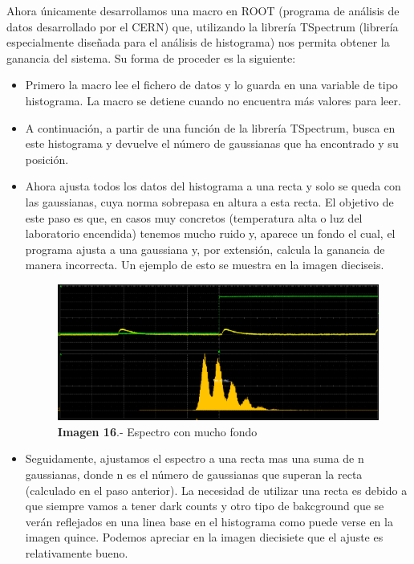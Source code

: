 Ahora únicamente desarrollamos una macro en ROOT (programa de análisis de datos desarrollado por el CERN) que, utilizando la librería TSpectrum (librería especialmente diseñada para el análisis de histograma) nos permita obtener la ganancia del sistema. Su forma de proceder es la siguiente:
\begin{itemize}
\item {} Primero la macro lee el fichero de datos y lo guarda en una variable de tipo histograma. La macro se detiene cuando no encuentra más valores para leer.

\item {} A continuación, a partir de una función de la librería TSpectrum, busca en este histograma y devuelve el número de gaussianas que ha encontrado y su posición.

\item {} Ahora ajusta todos los datos del histograma a una recta y solo se queda con las gaussianas, cuya norma sobrepasa en altura a esta recta. El objetivo de este paso es que, en casos muy concretos (temperatura alta o luz del laboratorio encendida) tenemos mucho ruido y, aparece un fondo el cual, el programa ajusta a una gaussiana y, por extensión, calcula la ganancia de manera incorrecta. Un ejemplo de esto se muestra en la imagen dieciseis.

\begin{figure}[hbtp]
\centering
\includegraphics[scale=0.2]{fondogaussiano.png}
\caption{\textbf{Imagen 16}.- Espectro con mucho fondo}
\end{figure}

\item {} Seguidamente, ajustamos el espectro a una recta mas una suma de n gaussianas, donde n es el número de gaussianas que superan la recta (calculado en el paso anterior). La necesidad de utilizar una recta es debido a que siempre vamos a tener dark counts y otro tipo de bakcground que se verán reflejados en una linea base en el histograma como puede verse en la imagen quince. Podemos apreciar en la imagen diecisiete que el ajuste es relativamente bueno.


\end{itemize}
